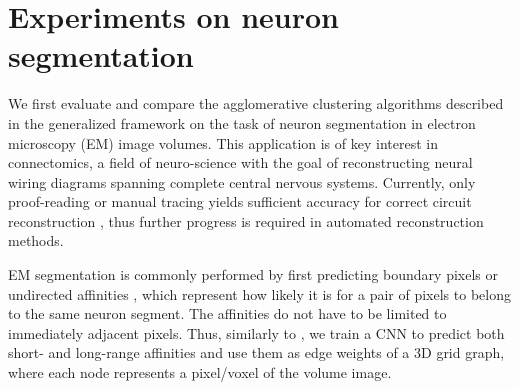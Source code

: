 


\section{Experiments on neuron segmentation}\label{sec:neuro_segm_exp}

We first evaluate and compare the agglomerative clustering algorithms described in the generalized framework on the task of neuron segmentation in electron microscopy (EM) image volumes. This application is of key interest in connectomics, a field of neuro-science with the goal of reconstructing neural wiring diagrams spanning complete central nervous systems. Currently, only proof-reading or manual tracing yields sufficient accuracy for correct circuit reconstruction \cite{schlegel2017learning}, thus further progress is required in automated reconstruction methods.

EM segmentation is commonly performed by first predicting 
boundary pixels \cite{beier2017multicut,ciresan2012deep} or undirected affinities \cite{wolf2018mutex,lee2017superhuman,funke2018large}, which represent how likely it is for a pair of pixels to belong to the same neuron segment. 
The affinities do not have to be limited to immediately adjacent pixels.
Thus, similarly to \cite{lee2017superhuman}, we train a CNN to predict both short- and long-range affinities
and use them as edge weights of a 3D grid graph, where each node represents a pixel/voxel of the volume image. 
